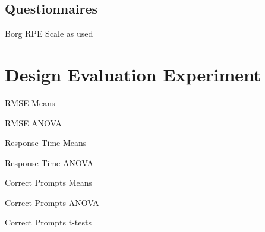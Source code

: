 \subsection{Questionnaires}

\begin{table}[H]
    \centering
    \caption{Borg RPE Scale as used}
    \label{tab:ph_borg_scale}
\end{table}

\section{Design Evaluation Experiment}

\begin{table}[H]
    \centering
    \caption{RMSE Means}
    \label{tab:de_rmse_means}
\end{table}

\begin{table}[H]
    \centering
    \caption{RMSE ANOVA}
    \label{tab:de_rmse_anova}
\end{table}

\begin{table}[H]
    \centering
    \caption{Response Time Means}
    \label{tab:de_response_time_means}
\end{table}

\begin{table}[H]
    \centering
    \caption{Response Time ANOVA}
    \label{tab:de_response_time_anova}
\end{table}

\begin{table}[H]
    \centering
    \caption{Correct Prompts Means}
    \label{tab:de_correct_means}
\end{table}

\begin{table}[H]
    \centering
    \caption{Correct Prompts ANOVA}
    \label{tab:de_correct_anova}
\end{table}

\begin{table}[H]
    \centering
    \caption{Correct Prompts t-tests}
    \label{tab:de_correct_ttests}
\end{table}

